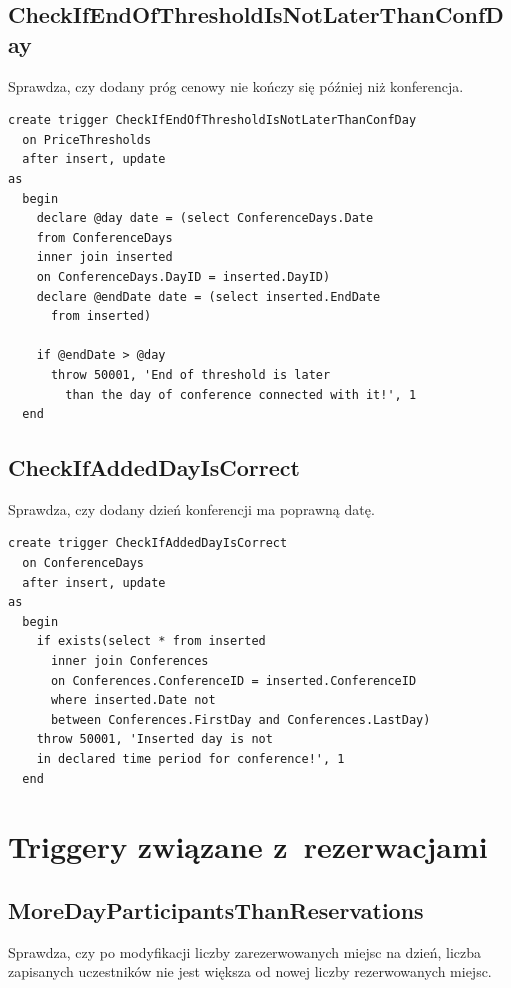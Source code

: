 \documentclass[12pt, a4paper]{mwrep}
\begin{document}
\subsection{CheckIfEndOfThresholdIsNotLaterThanConfDay}

\noindent Sprawdza, czy dodany próg cenowy nie kończy się później niż konferencja.

\begin{lstlisting}
create trigger CheckIfEndOfThresholdIsNotLaterThanConfDay
  on PriceThresholds
  after insert, update
as
  begin
    declare @day date = (select ConferenceDays.Date
    from ConferenceDays
    inner join inserted
    on ConferenceDays.DayID = inserted.DayID)
    declare @endDate date = (select inserted.EndDate
      from inserted)

    if @endDate > @day
      throw 50001, 'End of threshold is later 
        than the day of conference connected with it!', 1
  end
\end{lstlisting}

\subsection{CheckIfAddedDayIsCorrect}

\noindent Sprawdza, czy dodany dzień konferencji ma poprawną datę.

\begin{lstlisting}
create trigger CheckIfAddedDayIsCorrect
  on ConferenceDays
  after insert, update
as
  begin
    if exists(select * from inserted
      inner join Conferences
      on Conferences.ConferenceID = inserted.ConferenceID
      where inserted.Date not 
      between Conferences.FirstDay and Conferences.LastDay)
    throw 50001, 'Inserted day is not 
    in declared time period for conference!', 1
  end
\end{lstlisting}

\newpage
\section{Triggery związane z~rezerwacjami}

\subsection{MoreDayParticipantsThanReservations}

\noindent Sprawdza, czy po modyfikacji liczby zarezerwowanych miejsc na dzień, liczba zapisanych uczestników nie jest większa od nowej liczby rezerwowanych miejsc.
\end{document}
